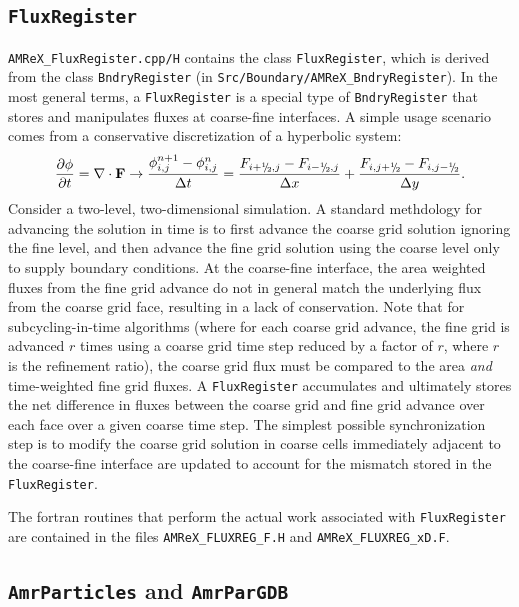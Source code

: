 \subsection{{\tt FluxRegister}}

{\tt AMReX\_FluxRegister.cpp/H} contains the class {\tt FluxRegister}, which is derived from
the class {\tt BndryRegister} (in {\tt Src/Boundary/AMReX\_BndryRegister}).
In the most general terms, a {\tt FluxRegister} is a special type of {\tt BndryRegister} that
stores and manipulates fluxes at coarse-fine interfaces.
A simple usage scenario comes from a conservative discretization of a hyperbolic system:
\begin{equation}
\frac{\partial\phi}{\partial t} = \nabla\cdot{\bf F}
\rightarrow
\frac{\phi_{i,j}^{n+1}-\phi_{i,j}^n}{\Delta t} = \frac{F_{i+\myhalf,j}-F_{i-\myhalf,j}}{\Delta x} + \frac{F_{i,j+\myhalf} - F_{i,j-\myhalf}}{\Delta y}.
\end{equation}
Consider a two-level, two-dimensional simulation.  A standard methdology for advancing the solution in 
time is to first advance the coarse grid solution ignoring the fine level, and then advance the fine 
grid solution using the coarse level only to supply boundary conditions.  At the coarse-fine interface, 
the area weighted fluxes from the fine grid advance do not in general match the underlying flux from 
the coarse grid face, resulting in a lack of conservation.  Note that for subcycling-in-time algorithms
(where for each coarse grid advance, the fine grid is advanced $r$ times using a coarse grid time step 
reduced by a factor of $r$, where $r$ is the refinement ratio), the coarse grid flux must 
be compared to the area {\it and} time-weighted fine grid fluxes.  A {\tt FluxRegister} accumulates 
and ultimately stores the net difference in fluxes between the coarse grid and fine grid advance over 
each face over a given coarse time step.  The simplest possible synchronization step is to modify
the coarse grid solution in coarse cells immediately adjacent to the coarse-fine interface are updated
to account for the mismatch stored in the {\tt FluxRegister}.

The fortran routines that perform the actual work associated with {\tt FluxRegister} are 
contained in the files {\tt AMReX\_FLUXREG\_F.H} and {\tt AMReX\_FLUXREG\_xD.F}.

\subsection{{\tt AmrParticles} and {\tt AmrParGDB}}

